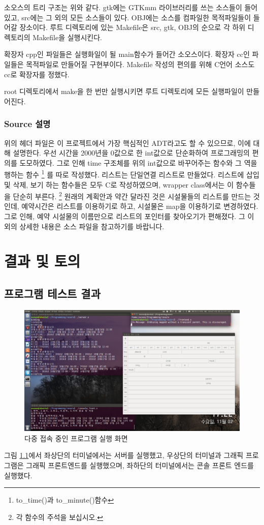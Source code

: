 \documentclass[12pt,a4paper]{report}
\begin{document}
소오스의 트리 구조는 위와 같다. 
gtk에는 GTKmm 라이브러리를 쓰는 소스들이 들어있고, src에는 그 외의 모든 소스들이 있다. 
OBJ에는 소스를 컴파일한 목적파일들이 들어갈 장소이다.
루트 디렉토리에 있는 Makefile은 src, gtk, OBJ의 순으로 각 하위 디렉토리의 Makefile을 실행시킨다.

확장자 cpp인 파일들은 실행화일이 될 main함수가 들어간 소오스이다.
확장자 cc인 파일들은 목적파일로 만들어질 구현부이다.
Makefile 작성의 편의를 위해 C언어 소스도 cc로 확장자를 정했다.

root 디렉토리에서 make을 한 번만 실행시키면 루트 디렉토리에 모든 실행파일이 만들어진다.

\subsection{Source 설명}


위의 헤더 파일은 이 프로젝트에서 가장 핵심적인 ADT라고도 할 수 있으므로, 이에 대해 설명한다.
우선 시간을 2000년을 0값으로 한 int값으로 단순화하여 프로그래밍의 편의를 도모하였다.
그로 인해 time 구조체를 위의 int값으로 바꾸어주는 함수와 그 역을 행하는 함수
\footnote{to\_time()과 to\_minute()함수}
를 따로 작성했다.
리스트는 단일연결 리스트로 만들었다. 
리스트에 삽입 및 삭제, 보기 하는 함수들은 모두 C로 작성하였으며, wrapper class에서는 이 함수들을 단순히 부른다.
\footnote{각 함수의 주석을 보십시오.}
원래의 계획안과 약간 달라진 것은 시설물들의 리스트를 만드는 것인데, 예약시간은 리스트를 이용하기로 하고, 시설물은 map을 이용하기로 변경하였다.
그로 인해, 예약 시설물의 이름만으로 리스트의 포인터를 찾아오기가 편해졌다.
그 이외의 상세한 내용은 소스 파일을 참고하기를 바랍니다.
\chapter{결과 및 토의}
\section{프로그램 테스트 결과}
\begin{figure}
\includegraphics[width=\textheight]{screen.png}
\caption{다중 접속 중인 프로그램 실행 화면}
\label{exe}
\end{figure}
그림 \ref{exe}에서 좌상단의 터미널에서는 서버를 실행했고, 우상단의 터미널과 그래픽 프로그램은 그래픽 프론트엔드를 실행했으며, 좌하단의 터미널에서는 콘솔 프론트 엔드를 실행했다.
\end{document}
